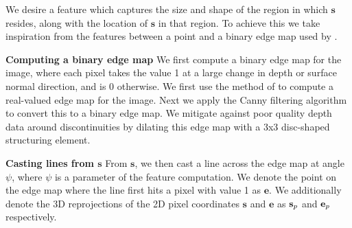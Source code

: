 \documentclass[10pt,twocolumn,letterpaper]{article}
\newcommand{\pixelidx}{\mathbf{s}}
\newcommand{\edgeimidx}{\mathbf{e}}
\newcommand{\point}{\mathbf{p}}
\renewcommand{\paragraph}{\vspace{2pt}\noindent\textbf}
\begin{document}
We desire a feature which captures the size and shape of the region in which $\pixelidx$ resides, along with the location of $\pixelidx$ in that region.
To achieve this we take inspiration from the features between a point and a binary edge map used by \cite{drost-3dimpvt-2012}.

\paragraph{Computing a binary edge map}
We first compute a binary edge map for the image, where each pixel takes the value 1 at a large change in depth or surface normal direction, and is 0 otherwise.
We first use the method of \cite{dollar-iccv-2013} to compute a real-valued edge map for the image. %
Next we apply the Canny filtering algorithm \cite{canny-pami-1986} to convert this to a binary edge map. %
We mitigate against poor quality depth data around discontinuities by dilating this edge map with a 3x3 disc-shaped structuring element.



\paragraph{Casting lines from $\pixelidx$}
From $\pixelidx$, we then cast a line across the edge map at angle $\psi$, where $\psi$ is a parameter of the feature computation.
We denote the point on the edge map where the line first hits a pixel with value 1 as $\edgeimidx$.
We additionally denote the 3D reprojections of the 2D pixel coordinates $\pixelidx$ and $\edgeimidx$ as $\pointthreed$ and $\edgethreed$ respectively.
\end{document}
